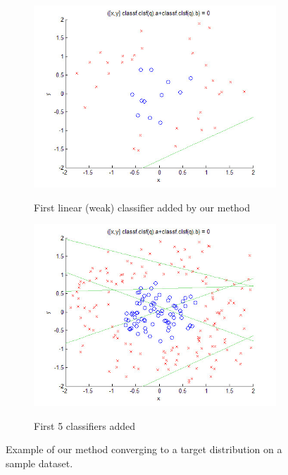\begin{figure}[t]
\begin{subfigure}[b]{.45\linewidth}
	 \end{subfigure}%

\begin{subfigure}[b]{.45\linewidth}
       \includegraphics[width=0.9\linewidth]{l1}
\label{lines1}
        \caption{First linear (weak) classifier added by our method}
      \end{subfigure}%
\hspace{.01\linewidth}
\begin{subfigure}[b]{.45\linewidth}
	 \includegraphics[width=0.9\linewidth]{l2}
       \label{lines2}
      \caption{First 5 classifiers added}
  
	 \end{subfigure}%
    \caption{Example of our method converging to  a target distribution on a sample dataset.}
    \label{convo}
\end{figure}

